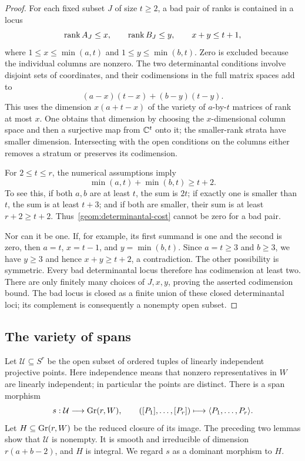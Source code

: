 \begin{proof}
For each fixed subset $J$ of size $t\geq2$, a bad pair of ranks is
contained in a locus
\[
 \operatorname{rank} A_J\leq x,\qquad \operatorname{rank} B_J\leq y,
 \qquad x+y\leq t+1,
\]
where $1\leq x\leq\min(a,t)$ and $1\leq y\leq\min(b,t)$.
Zero is excluded because the individual columns are nonzero.
The two determinantal conditions involve disjoint sets of coordinates,
and their codimensions in the full matrix spaces add to
\begin{equation}\label{geom:determinantal-cost}
 (a-x)(t-x)+(b-y)(t-y).
\end{equation}
This uses the dimension $x(a+t-x)$ of the variety of $a$-by-$t$
matrices of rank at most $x$. One obtains that dimension by choosing
the $x$-dimensional column space and then a surjective map from
$\mathbb C^t$ onto it; the smaller-rank strata have smaller dimension.
Intersecting with the open conditions on the columns either removes
a stratum or preserves its codimension.

For $2\leq t\leq r$, the numerical assumptions imply
\begin{equation}\label{geom:generic-ranks}
 \min(a,t)+\min(b,t)\geq t+2.
\end{equation}
To see this, if both $a,b$ are at least $t$, the sum is $2t$;
if exactly one is smaller than $t$, the sum is at least $t+3$;
and if both are smaller, their sum is at least $r+2\geq t+2$.
Thus~\eqref{geom:determinantal-cost} cannot be zero for a bad pair.

Nor can it be one. If, for example, its first summand is one and
the second is zero, then $a=t$, $x=t-1$, and $y=\min(b,t)$.
Since $a=t\geq3$ and $b\geq3$, we have $y\geq3$ and hence
$x+y\geq t+2$, a contradiction. The other possibility is symmetric.
Every bad determinantal locus therefore has codimension at least two.
There are only finitely many choices of $J,x,y$, proving the asserted
codimension bound. The bad locus is closed as a finite union of these
closed determinantal loci; its complement is consequently a nonempty
open subset.
\end{proof}

\subsection{The variety of spans}
\label{geom:span-variety}

Let $\mathcal U\subseteq S^r$ be the open subset of ordered tuples
of linearly independent projective points. Here independence means
that nonzero representatives in $W$ are linearly independent; in
particular the points are distinct. There is a span morphism
\[
 s:\mathcal U\longrightarrow\operatorname{Gr}(r,W),\qquad
 ([P_1],\ldots,[P_r])\longmapsto\langle P_1,\ldots,P_r\rangle.
\]
Let $H\subseteq\operatorname{Gr}(r,W)$ be the reduced closure of its image.
The preceding two lemmas show that $\mathcal U$ is nonempty.
It is smooth and irreducible of dimension $r(a+b-2)$, and $H$ is
integral. We regard $s$ as a dominant morphism to $H$.

